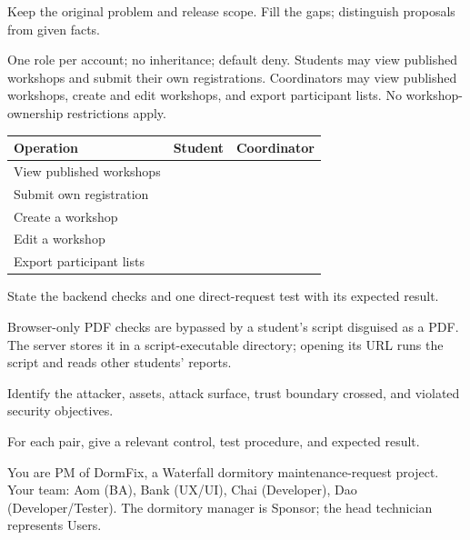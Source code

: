 \endgroup
{}
Keep the original problem and release scope. Fill the gaps; distinguish proposals from given facts.\par
\blankbox{8.5cm}
\newpage
{}
One role per account; no inheritance; default deny. Students may view published workshops and submit their own registrations. Coordinators may view published workshops, create and edit workshops, and export participant lists. No workshop-ownership restrictions apply.\par
{}
\begin{tabularx}{\linewidth}{|Y|M{2.8cm}|M{2.8cm}|}\hline
Operation & Student & Coordinator\\\hline
View published workshops & &\\\hline
Submit own registration & &\\\hline
Create a workshop & &\\\hline
Edit a workshop & &\\\hline
Export participant lists & &\\\hline
\end{tabularx}
State the backend checks and one direct-request test with its expected result.\par
\blankbox{2.5cm}
\medskip
{}
Browser-only PDF checks are bypassed by a student's script disguised as a PDF. The server stores it in a script-executable directory; opening its URL runs the script and reads other students' reports.\par
{}
Identify the attacker, assets, attack surface, trust boundary crossed, and violated security objectives.\par
\blankbox{3cm}
For each pair, give a relevant control, test procedure, and expected result.\par
\blankbox{4cm}
\newpage
{}
You are PM of DormFix, a Waterfall dormitory maintenance-request project. Your team: Aom (BA), Bank (UX/UI), Chai (Developer), Dao (Developer/Tester). The dormitory manager is Sponsor; the head technician represents Users.\par
